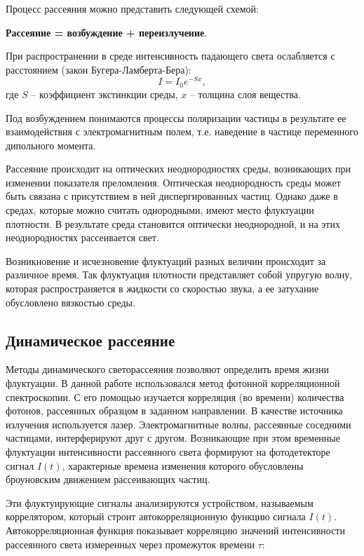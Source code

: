 \documentclass[a4paper,12pt]{article} %
\begin{document}
Процесс рассеяния можно представить следующей схемой:
\begin{center}
    \textbf{Рассеяние = возбуждение + переизлучение}. 
\end{center}
При распространении в среде интенсивность падающего света ослабляется с расстоянием (закон Бугера-Ламберта-Бера): 
\begin{equation}
    I = I_0e^{-Sx}, 
\end{equation}
где $S$ – коэффициент экстинкции среды, $x$ – толщина слоя вещества.

Под возбуждением понимаются процессы поляризации частицы в результате ее взаимодействия с электромагнитным полем, т.е. наведение в частице переменного дипольного момента. 

Рассеяние происходит на оптических неоднородностях среды, возникающих при изменении показателя преломления. Оптическая неоднородность среды может быть связана с присутствием в ней диспергированных частиц. Однако даже в средах, которые можно считать однородными, имеют место флуктуации плотности. В результате среда становится оптически неоднородной, и на этих неоднородностях рассеивается свет.

Возникновение и исчезновение флуктуаций разных величин происходит за различное время. Так флуктуация плотности представляет собой упругую волну, которая распространяется в жидкости со скоростью звука, а ее затухание обусловлено вязкостью среды. 

\subsection{Динамическое рассеяние}
Методы динамического светорассеяния позволяют определить время жизни флуктуации. В данной работе использовался метод фотонной корреляционной спектроскопии. С его помощью изучается корреляция (во времени) количества фотонов, рассеянных образцом в заданном направлении. В качестве источника излучения используется лазер. Электромагнитные волны, рассеянные соседними частицами, интерферируют друг с другом. Возникающие при этом временные флуктуации интенсивности рассеянного света формируют на фотодетекторе сигнал $I(t)$, характерные времена изменения которого обусловлены броуновским движением рассеивающих частиц.

Эти флуктуирующие сигналы анализируются устройством, называемым коррелятором, который строит автокорреляционную функцию сигнала $I(t)$. Автокорреляционная функция показывает корреляцию значений интенсивности рассеянного света измеренных через промежуток времени $\tau$:
\end{document}

